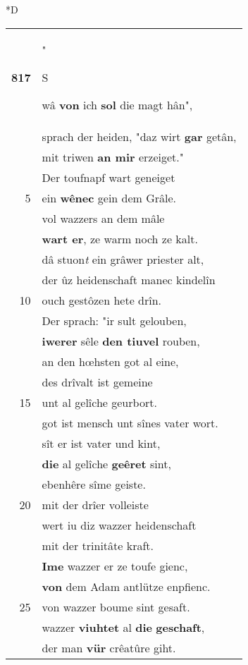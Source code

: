 \documentclass[8pt,a4paper,notitlepage]{article}
\begin{document}
\begin{table}[ht]
\begin{minipage}[t]{0.5\linewidth}
\small
\begin{center}*D
\end{center}
\begin{tabular}{rl}
\textbf{817} & "\begin{large}S\end{large}wâ \textbf{von} ich \textbf{sol} die magt hân",\\ 
 & sprach der heiden, "daz wirt \textbf{gar} getân,\\ 
 & mit triwen \textbf{an mir} erzeiget."\\ 
 & Der toufnapf wart geneiget\\ 
5 & ein \textbf{wênec} gein dem Grâle.\\ 
 & vol wazzers an dem mâle\\ 
 & \textbf{wart er}, ze warm noch ze kalt.\\ 
 & dâ stuon\textit{t} ein grâwer priester alt,\\ 
 & der ûz heidenschaft manec kindelîn\\ 
10 & ouch gestôzen hete drîn.\\ 
 & Der sprach: "ir sult gelouben,\\ 
 & \textbf{iwerer} sêle \textbf{den tiuvel} rouben,\\ 
 & an den hœhsten got al eine,\\ 
 & des drîvalt ist gemeine\\ 
15 & unt al gelîche geurbort.\\ 
 & got ist mensch unt sînes vater wort.\\ 
 & sît er ist vater und kint,\\ 
 & \textbf{die} al gelîche \textbf{geêret} sint,\\ 
 & ebenhêre sîme geiste.\\ 
20 & mit der drîer volleiste\\ 
 & wert iu diz wazzer heidenschaft\\ 
 & mit der trinitâte kraft.\\ 
 & \textbf{Ime} wazzer er ze toufe gienc,\\ 
 & \textbf{von} dem Adam antlütze enpfienc.\\ 
25 & von wazzer boume sint gesaft.\\ 
 & wazzer \textbf{viuhtet} al \textbf{die} \textbf{geschaft},\\ 
 & der man \textbf{vür} crêatûre giht.\\ 

\end{tabular}
\end{minipage}
\end{table}
\end{document}
